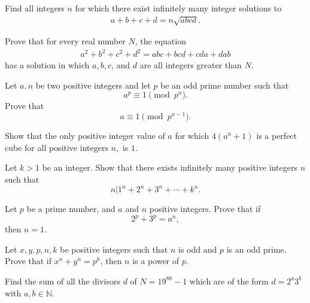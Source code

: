 \documentclass{subfile}
\begin{document}
	\begin{problem}[Vietnam 2002]
		Find all integers \(n\) for which there exist infinitely many integer solutions to
			\begin{align*}
				a + b + c + d = n \sqrt{ abcd }.
			\end{align*}
	\end{problem}
	
	\begin{problem}[Putnam 1933]
		Prove that for every real number $N$, the equation
			\begin{align*}
				a^2 + b^2 + c^2 + d^2 = abc + bcd + cda + dab
			\end{align*}
		has a solution in which $a, b, c$, and $d$ are all integers greater than $N$.
	\end{problem}
	
	\begin{problem}
		Let $a,n$ be two positive integers and let $p$ be an odd prime number such that
		\[a^p \equiv 1 \pmod{p^n}.\]
		Prove that
		\[a \equiv 1 \pmod{p^{n-1}}.\]
	\end{problem} 
	
	\begin{problem}
		Show that the only positive integer value of $a$ for which $4(a^n+1)$ is a perfect cube for all positive integers $n,$ is $1.$
	\end{problem} 
	
	\begin{problem}
		Let $k>1$ be an integer. Show that there exists infinitely many positive integers $n$ such that
		\[n | 1^n + 2^n +3^n +\cdots+k^n.\]
	\end{problem} 
	
	
	\begin{problem}[Ireland 1996] 
		Let $p$ be a prime number, and $a$ and $n$ positive integers. Prove that if
		\[2^p+3^p=a^n,\]
		then $n=1.$
	\end{problem} 
	
	
	
	\begin{problem}[Russia 1996] 
		Let $x, y, p, n, k$ be positive integers such that $n$ is odd and $p$ is an odd prime. Prove that if $x^n + y^n = p^k$, then $n$ is a power of $p$.
	\end{problem} 
	
	\begin{problem}
		Find the sum of all the divisors $d$ of $N=19^{88}-1$ which are of the form $d=2^{a}3^{b}$ with  $a,b \in \mathbb N$.
	\end{problem} 
	
\end{document}
